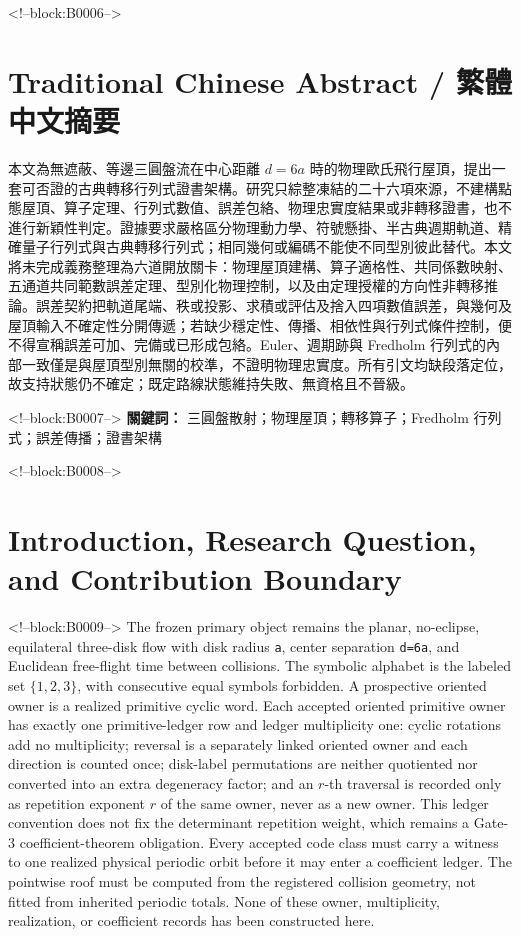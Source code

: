 \documentclass[11pt,a4paper]{article}
\begin{document}
<!--block:B0006-->
\begin{otherlanguage}{chinese-traditional}
\section*{Traditional Chinese Abstract / 繁體中文摘要}
本文為無遮蔽、等邊三圓盤流在中心距離 \(d=6a\) 時的物理歐氏飛行屋頂，提出一套可否證的古典轉移行列式證書架構。研究只綜整凍結的二十六項來源，不建構點態屋頂、算子定理、行列式數值、誤差包絡、物理忠實度結果或非轉移證書，也不進行新穎性判定。證據要求嚴格區分物理動力學、符號懸掛、半古典週期軌道、精確量子行列式與古典轉移行列式；相同幾何或編碼不能使不同型別彼此替代。本文將未完成義務整理為六道開放關卡：物理屋頂建構、算子適格性、共同係數映射、五通道共同範數誤差定理、型別化物理控制，以及由定理授權的方向性非轉移推論。誤差契約把軌道尾端、秩或投影、求積或評估及捨入四項數值誤差，與幾何及屋頂輸入不確定性分開傳遞；若缺少穩定性、傳播、相依性與行列式條件控制，便不得宣稱誤差可加、完備或已形成包絡。Euler、週期跡與 Fredholm 行列式的內部一致僅是與屋頂型別無關的校準，不證明物理忠實度。所有引文均缺段落定位，故支持狀態仍不確定；既定路線狀態維持失敗、無資格且不晉級。

<!--block:B0007-->
\noindent\textbf{關鍵詞：} 三圓盤散射；物理屋頂；轉移算子；Fredholm 行列式；誤差傳播；證書架構
\end{otherlanguage}

<!--block:B0008-->
\section{Introduction, Research Question, and Contribution Boundary}

<!--block:B0009-->
The frozen primary object remains the planar, no-eclipse, equilateral three-disk flow with disk radius \texttt{a}, center separation \texttt{d=6a}, and Euclidean free-flight time between collisions. The symbolic alphabet is the labeled set \(\{1,2,3\}\), with consecutive equal symbols forbidden. A prospective oriented owner is a realized primitive cyclic word. Each accepted oriented primitive owner has exactly one primitive-ledger row and ledger multiplicity one: cyclic rotations add no multiplicity; reversal is a separately linked oriented owner and each direction is counted once; disk-label permutations are neither quotiented nor converted into an extra degeneracy factor; and an \(r\)-th traversal is recorded only as repetition exponent \(r\) of the same owner, never as a new owner. This ledger convention does not fix the determinant repetition weight, which remains a Gate-3 coefficient-theorem obligation. Every accepted code class must carry a witness to one realized physical periodic orbit before it may enter a coefficient ledger. The pointwise roof must be computed from the registered collision geometry, not fitted from inherited periodic totals. None of these owner, multiplicity, realization, or coefficient records has been constructed here.
\end{document}
